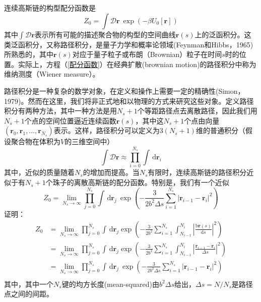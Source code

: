 连续高斯链的构型配分函数是
\begin{equation}
Z_0=\int \mathcal{D}\mathbf{r}~\exp(-\beta U_0[\mathbf{r}]) \label{配分函数}
\end{equation}
其中$\int \mathcal{D}\mathbf{r}$表示所有可能的描述聚合物的构型的空间曲线$\mathbf{r}(s)$上的泛函积分。这类泛函积分，又称路径积分，是量子力学和概率论领域(Feynman和Hibbs，1965)所熟悉的，其中$\mathbf{r}(s)$对应于量子粒子或布朗（Brownian）粒子在时间$s$时的位置。实际上，方程（\ref{配分函数}）在经典扩散(brownian motion)的路径积分中称为维纳测度（Wiener measure）。

路径积分是一种复杂的数学对象，在定义和操作上需要一定的精确性(Simon，1979)。然而在这里，我们将非正式地和以物理的方式来研究这些对象。定义路径积分有两种方法，其中一种方法是用$N_s+1$个等距路径点去离散路径，因此我们用$N_s+1$个点的空间位置逼近连续函数$\mathbf{r}(s)$，其中这$N_s+1$个点由向量$(\mathbf{r}_0,\mathbf{r}_1,...,\mathbf{r}_{N_s})$表示。这样，路径积分可以定义为$3(N_s+1)$维的普通积分（假设聚合物在体积为$V$的三维空间中）
\begin{equation}
\int \mathcal{D}\mathbf{r}\approx \prod_{i=0}^{N_s} \int \, \mathrm{d} \mathbf{r}_i
\end{equation}
其中，近似的质量随着$N_s$的增加而提高。当$N_s$有限时，连续高斯链的路径积分近似于有$N_s+1$个珠子的离散高斯链的配分函数。特别是，我们有一个近似
\begin{equation}
Z_0=\lim_{N_s \to \infty} \prod_{j=0}^{N_s} \int \, \mathrm{d} \mathbf{r}_j~\exp \left( -\frac{3}{2b^2\Delta s}\sum_{i=1}^{N_s}\left|\mathbf{r}_{i-1}-\mathbf{r}_i \right|^2 \right) \label{离散近似公式}
\end{equation}
证明：
\begin{equation*}
\begin{aligned}
Z_0 &=\lim_{N_s \to \infty} \prod_{j=0}^{N_s} \int \, \mathrm{d} \mathbf{r}_j\exp\left(-\frac{3}{2b^2} \sum_{i=1}^{N_s} \int _{N_{i-1}}^{N_i} \left| \frac{\mathrm{b} \mathbf{r} (s) } {\mathrm{d} s} \right|^2 \right)\\ & =  \lim_{N_s \to \infty} \prod_{j=0}^{N_s} \int \, \mathrm{d} \mathbf{r}_j\exp\left(-\frac{3}{2b^2}\sum_{i=1}^{N_s}\int _{N_{i-1}}^{N_i}\left|\frac{\mathbf{r}_{i-1}-\mathbf{r}_i}{\Delta s} \right|^2 \right) \\ &=  \lim_{N_s \to \infty} \prod_{j=0}^{N_s} \int \, \mathrm{d} \mathbf{r}_j~\exp \left( -\frac{3}{2b^2\Delta s}\sum_{i=1}^{N_s}\left|\mathbf{r}_{i-1}-\mathbf{r}_i \right|^2 \right)\\ 
\end{aligned}
\end{equation*}
其中，其中一个$N_s$键的均方长度(mean-squared)由$b^2\Delta s$给出，$\Delta s=N/N_s$是路径点之间的间距。


